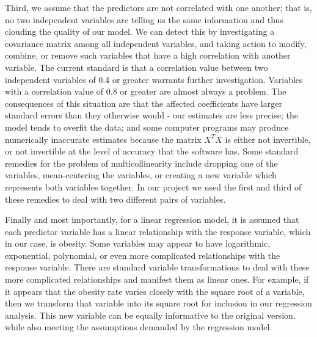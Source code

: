 \documentclass[oneside,12pt]{report}
\begin{document}
Third, we assume that the predictors are not correlated with one another; that is, no two independent variables are telling us the same information and thus clouding the quality of our model. We can detect this by investigating a covariance matrix among all independent variables, and taking action to modify, combine, or remove such variables that have a high correlation with another variable. The current standard is that a correlation value between two independent variables of 0.4 or greater warrants further investigation. Variables with a correlation value of 0.8 or greater are almost always a problem. The consequences of this situation are that the affected coefficients have larger standard errors than they otherwise would - our estimates are less precise; the model tends to overfit the data; and some computer programs may produce numerically inaccurate estimates because the matrix \begin{math}X^{T}X\end{math} is either not invertible, or not invertible at the level of accuracy that the software has. Some standard remedies for the problem of multicollinearity include dropping one of the variables, mean-centering the variables, or creating a new variable which represents both variables together. In our project we used the first and third of these remedies to deal with two different pairs of variables.

Finally and most importantly, for a linear regression model, it is assumed that each predictor variable has a linear relationship with the response variable, which in our case, is obesity. Some variables may appear to have logarithmic, exponential, polynomial, or even more complicated relationships with the response variable. There are standard variable transformations to deal with these more complicated relationships and manifest them as linear ones. For example, if it appears that the obesity rate varies closely with the square root of a variable, then we transform that variable into its square root for inclusion in our regression analysis. This new variable can be equally informative to the original version, while also meeting the assumptions demanded by the regression model.
\end{document}
